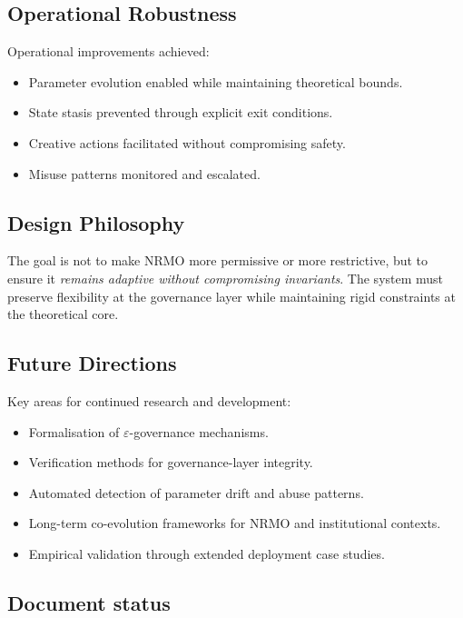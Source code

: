 \subsection{Operational Robustness}

Operational improvements achieved:

\begin{itemize}
\item Parameter evolution enabled while maintaining theoretical
bounds.
\item State stasis prevented through explicit exit conditions.
\item Creative actions facilitated without compromising safety.
\item Misuse patterns monitored and escalated.
\end{itemize}

\subsection{Design Philosophy}

The goal is not to make NRMO more permissive or more restrictive,
but to ensure it \emph{remains adaptive without compromising
invariants}. The system must preserve flexibility at the governance
layer while maintaining rigid constraints at the theoretical core.


\subsection{Future Directions}

Key areas for continued research and development:

\begin{itemize}
\item Formalisation of $\varepsilon$-governance mechanisms.
\item Verification methods for governance-layer integrity.
\item Automated detection of parameter drift and abuse patterns.
\item Long-term co-evolution frameworks for NRMO and institutional
contexts.
\item Empirical validation through extended deployment case
studies.
\end{itemize}

\subsection*{Document status}

